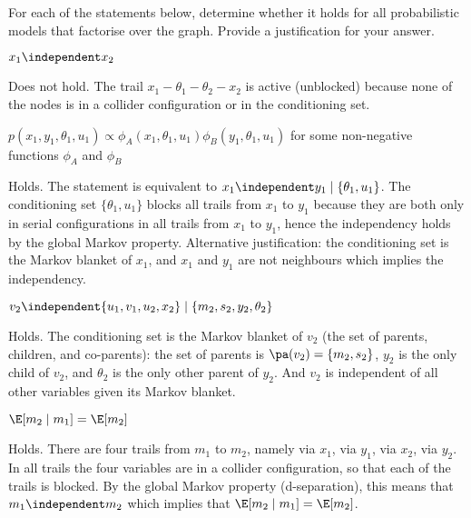     For each of the statements below, determine whether it holds for
   all probabilistic models that factorise over the graph. Provide a
   justification for your answer.
   
   \begin{exenumerate}
   \item $x_1 \independent x_2$

     \begin{solution}
       Does not hold. The trail $x_1 - \theta_1 - \theta_2 - x_2$ is
       active (unblocked) because none of the nodes is in a collider
       configuration or in the conditioning set.
     \end{solution}
     
   \item $p(x_1, y_1, \theta_1, u_1) \propto \phi_A(x_1, \theta_1, u_1)\phi_B(y_1, \theta_1, u_1)$ for some non-negative functions $\phi_A$ and $\phi_B$ 

     \begin{solution}
       Holds. The statement is equivalent to $x_1 \independent y_1
       \mid \{\theta_1, u_1\}$. The conditioning set $\{\theta_1,
       u_1\}$ blocks all trails from $x_1$ to $y_1$ because they are
       both only in serial configurations in all trails from $x_1$ to
       $y_1$, hence the independency holds by the global Markov
       property.  Alternative justification: the conditioning set is
       the Markov blanket of $x_1$, and $x_1$ and $y_1$ are not
       neighbours which implies the independency.
     \end{solution}
     
   \item $v_2 \independent \{u_1, v_1, u_2, x_2\} \mid \{m_2, s_2, y_2, \theta_2\}$

     \begin{solution}
        Holds. The conditioning set is the Markov blanket of $v_2$
        (the set of parents, children, and co-parents): the set of
        parents is $\pa(v_2)=\{m_2, s_2\}$, $y_2$ is the only child of
        $v_2$, and $\theta_2$ is the only other parent of
        $y_2$. And $v_2$ is independent of all other variables
        given its Markov blanket.
     \end{solution}

   \item $\E [ m_2 \mid  m_1 ] = \E[m_2]$

     \begin{solution}
       Holds. There are four trails from $m_1$ to $m_2$, namely via
       $x_1$, via $y_1$, via $x_2$, via $y_2$. In all trails the four
       variables are in a collider configuration, so that each of the
       trails is blocked. By the global Markov property
       (d-separation), this means that $m_1 \independent m_2$ which
       implies that $\E[m_2 \mid m_1] = \E[m_2]$.


\end{solution}
\end{exenumerate}
